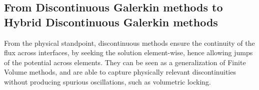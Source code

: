 


\subsection{From Discontinuous Galerkin methods to Hybrid Discontinuous Galerkin methods}

From the physical standpoint, discontinuous methods ensure the continuity of the flux
across interfaces, by seeking the solution element-wise, hence allowing
jumps of the potential across elements. They can be seen as a
generalization of Finite Volume methods, and are able to capture
physically relevant discontinuities without producing spurious
oscillations, such as volumetric locking.


